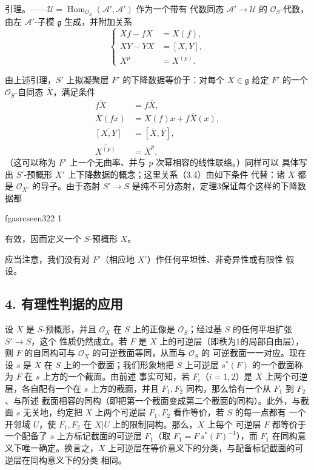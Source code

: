 \documentclass[12pt,twoside,openany]{book}
\numberwithin{equation}{section}
\newcommand{\fgaunitid}{unbound}
\newcommand{\src}[1]{%
  \phantomsection
  \hypertarget{src:\fgaunitid:#1}{}%
  \hypertarget{fga.\fgaunitid.p#1}{}%
  \ifcsname fgasrcseen#1\endcsname\else
    \expandafter\gdef\csname fgasrcseen#1\endcsname{1}%
    \hypertarget{src:#1}{}%
  \fi
  \marginpar{\raggedleft\footnotesize\sffamily #1}%
}
\theoremstyle{plain}
\theoremstyle{definition}
\theoremstyle{remark}
\begin{document}
\textsc{引理。}——$\mathcal U=
\operatorname{Hom}_{\mathcal O_S}(\mathcal A',\mathcal A')$ 作为一个带有
代数同态 $\mathcal A'\longrightarrow\mathcal U$ 的 $\mathcal O_S$-代数，
由左 $\mathcal A'$-子模 $\mathfrak g$ 生成，并附加关系
\begin{equation}
  \left\{
  \begin{aligned}
    Xf-fX&=X(f),\\
    XY-YX&=[X,Y],\\
    X^p&=X^{(p)}.
  \end{aligned}
  \right.
  \tag{3.6}
\end{equation}

由上述引理，$S'$ 上拟凝聚层 $F'$ 的下降数据等价于：对每个
$X\in\mathfrak g$ 给定 $F'$ 的一个 $\mathcal O_S$-自同态
$\overline X$，满足条件
\begin{align}
  \overline{fX}&=f\overline X, \tag{3.7}\\
  \overline X(fx)&=X(f)x+f\overline X(x), \tag{3.8}\\
  \overline{[X,Y]}&=[\overline X,\overline Y], \tag{3.9}\\
  \overline{X^{(p)}}&=\overline X^p. \tag{3.10}
\end{align}
（这可以称为 $F'$ 上一个无曲率、并与 $p$ 次幂相容的线性联络。）同样可以
具体写出 $S'$-预概形 $X'$ 上下降数据的概念；这里关系（3.4）由如下条件
代替：诸 $\overline X$ 都是 $\mathcal O_{X'}$ 的导子。由于态射
$S'\longrightarrow S$ 是纯不可分态射，定理3保证每个这样的下降数据都

\src{322}
有效，因而定义一个 $S$-预概形 $X$。

应当注意，我们没有对 $F'$（相应地 $X'$）作任何平坦性、非奇异性或有限性
假设。

\subsection*{4. 有理性判据的应用}

设 $X$ 是 $S$-预概形，并且 $\mathcal O_X$ 在 $S$ 上的正像是
$\mathcal O_S$；经过基 $S$ 的任何平坦扩张 $S'\longrightarrow S$，这个
性质仍然成立。若 $F$ 是 $X$ 上的可逆层（即秩为1的局部自由层），则 $F$
的自同构可与 $\mathcal O_X$ 的可逆截面等同，从而与 $\mathcal O_S$ 的
可逆截面一一对应。现在设 $s$ 是 $X$ 在 $S$ 上的一个截面；我们形象地把
$S$ 上可逆层 $s^*(F)$ 的一个截面称为 $F$ 在 $s$ 上方的一个截面。由前述
事实可知，若 $F_i$（$i=1,2$）是 $X$ 上两个可逆层，各自配有一个在 $s$
上方的截面，并且 $F_1,F_2$ 同构，那么恰有一个从 $F_1$ 到 $F_2$、与所述
截面相容的同构（即把第一个截面变成第二个截面的同构）。此外，与截面 $s$
无关地，约定把 $X$ 上两个可逆层 $F_1,F_2$ 看作等价，若 $S$ 的每一点都有
一个开邻域 $U$，使 $F_1,F_2$ 在 $X|U$ 上的限制同构。那么，$X$ 上每个
可逆层 $F$ 都等价于一个配备了 $s$ 上方标记截面的可逆层 $F_1$（取
$F_1=F\,s^*(F)^{-1}$），而 $F_1$ 在同构意义下唯一确定。换言之，$X$
上可逆层在等价意义下的分类，与配备标记截面的可逆层在同构意义下的分类
相同。
\end{document}
